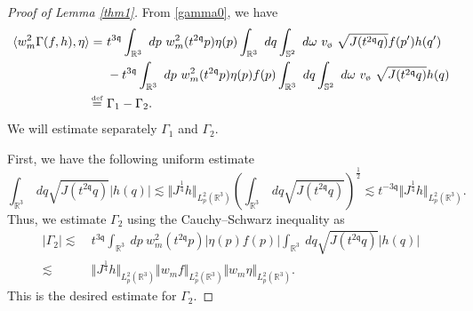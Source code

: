 \documentclass[reqno]{amsart}
\newcommand{\eqdef }{\overset{\mbox{\tiny{def}}}{=}}
\newcommand{\pv}{p}
\newcommand{\qv}{q}
\def\norm#1{\big\Vert#1\big\Vert}
\newcommand{\threed}{{\mathbb R}^3}
\newcommand{\qq}{\mathfrak{q}}
\newcommand{\tqq}{t^{2\qq}}
\newcommand{\tTq}{t^{3\qq}}
\newcommand{\tmTq}{t^{-3\qq}}
\newcommand{\Emptyset}{\text{\o}}
\theoremstyle{definition}
\numberwithin{equation}{section}
\numberwithin{theorem}{section}
\begin{document}
\begin{proof}[Proof of Lemma \ref{thm1}]
From \eqref{gamma0}, we have 
\begin{align*}
  \langle w_{m}^2\Gamma(f,h),\eta\rangle   
 = &~
\tTq \int_{\mathbb{R}^3} ~  d\pv ~w_{m}^2(\tqq \pv)\eta (\pv)\int_{\mathbb{R}^3} ~  d\qv 
\int_{\mathbb{S}^{2}} ~ d\omega
~ v_{\Emptyset} ~   \sqrt{J(\tqq q)}
f(p^{\prime })h(q^{\prime})
 \\
   &~
-\tTq \int_{\mathbb{R}^3} ~  d\pv ~w_{m}^2(\tqq \pv)\eta (\pv) f(\pv)\int_{\mathbb{R}^3} ~  d\qv 
\int_{\mathbb{S}^{2}} ~ d\omega
~ v_{\Emptyset} ~   \sqrt{J(\tqq q)}
h(q)
 \\
  \eqdef &~\Gamma_1 - \Gamma_2.
\end{align*}
We will estimate separately $\Gamma_1$ and $\Gamma_2$.

First, we have the following uniform estimate
\begin{equation*}
    \int_{\mathbb{R}^3} ~  d\qv 
   \sqrt{J(\tqq q)}
 \left| h(q)\right|
 \lesssim
 \norm{J^{\frac14} h}_{L^2_p(\threed)}  \left(    \int_{\mathbb{R}^3} ~  d\qv 
   \sqrt{J(\tqq q)} \right)^{\frac12}
   \lesssim
   \tmTq
    \norm{J^{\frac14}h}_{L^2_p(\threed)}.
\end{equation*}
Thus, we estimate $\Gamma_2$ using the Cauchy--Schwarz inequality as
\begin{align*}
\left| \Gamma_2 \right|  
 \lesssim &~
\tTq   \int_{\mathbb{R}^3} ~  d\pv ~ w_{m}^2(\tqq \pv)\left| \eta (\pv) f(p)\right|\int_{\mathbb{R}^3} ~  d\qv 
   \sqrt{J(\tqq q)}
 \left| h(q)\right|
 \\
  \lesssim &~
  \norm{J^{\frac14}h}_{L^2_p(\threed)}
\norm{w_{m}f}_{L^2_p(\threed)} \norm{w_{m}\eta}_{L^2_p(\threed)}.
\end{align*}
This is the desired estimate for $\Gamma_2$.


\end{proof}
\end{document}
